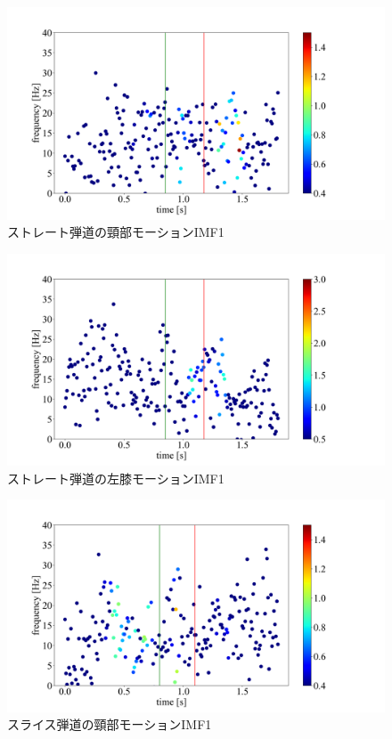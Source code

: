 \begin{figure}[tb]
    \centering
    \includegraphics[width=1.0\linewidth]{./images/straight_data/neck/IMF1.png}
    \caption{ストレート弾道の頸部モーションIMF1}
    \label{straight neck imf1}
\end{figure}

\begin{figure}[tb]
    \centering
    \includegraphics[width=1.0\linewidth]{./images/straight_data/left_leg/IMF1.png}
    \caption{ストレート弾道の左膝モーションIMF1}
    \label{straight left leg imf1}
\end{figure}

\begin{figure}[tb]
    \centering
    \includegraphics[width=1.0\linewidth]{./images/headup_data/neck/IMF1.png}
    \caption{スライス弾道の頸部モーションIMF1}
    \label{headup neck imf1}
\end{figure}

